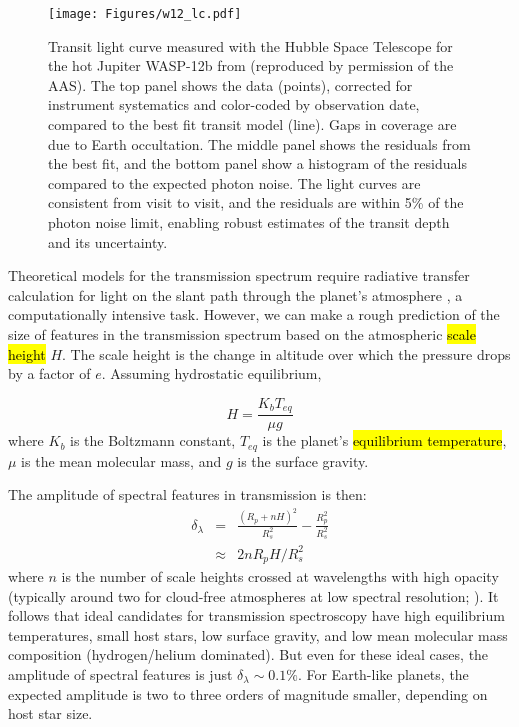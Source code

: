 \documentclass[graybox,natbib,nosecnum]{svmult}
\newcommand{\hbindex}[1]{\hl{#1}\index{#1}}  %
\begin{document}
\begin{figure}
\begin{centering}
\texttt{[image: Figures/w12\_lc.pdf]}
\caption{Transit light curve measured with the Hubble Space Telescope for the hot Jupiter WASP-12b from \citealt{kreidberg15b} (reproduced by permission of the AAS). The top panel shows the data (points), corrected for instrument systematics and color-coded by observation date, compared to the best fit transit model (line). Gaps in coverage are due to Earth occultation. The middle panel shows the residuals from the best fit, and the bottom panel show a histogram of the residuals compared to the expected photon noise. The light curves are consistent from visit to visit, and the residuals are within 5\% of the photon noise limit, enabling robust estimates of the transit depth and its uncertainty.}
\label{fig:lc}       
\end{centering}
\end{figure}

Theoretical models for the transmission spectrum require radiative transfer calculation for light on the slant path through the planet's atmosphere \citep{seager00}, a computationally intensive task. However, we can make a rough prediction of the size of features in the transmission spectrum based on the atmospheric \hbindex{scale height} $H$. The scale height is the change in altitude over which the pressure drops by a factor of $e$. Assuming hydrostatic equilibrium, 

\begin{equation}
H = \frac{K_bT_{eq}}{\mu g}
\end{equation}
where $K_b$ is the Boltzmann constant, $T_{eq}$ is the planet's \hbindex{equilibrium temperature}, $\mu$ is the mean molecular mass, and $g$ is the surface gravity.

The amplitude of spectral features in transmission is then:
\begin{eqnarray}
\delta_\lambda &=& \frac{(R_p + nH)^2}{R_s^2} - \frac{R_p^2}{R_s^2}\\
 & \approx & 2nR_pH/R_s^2
\end{eqnarray} 
where $n$ is the number of scale heights crossed at wavelengths with high opacity (typically around two for cloud-free atmospheres at low spectral resolution; \citealt{stevenson16}). It follows that ideal candidates for transmission spectroscopy have high equilibrium temperatures, small host stars, low surface gravity, and low mean molecular mass composition (hydrogen/helium dominated). But even for these ideal cases, the amplitude of spectral features is just $\delta_\lambda \sim0.1\%$. For Earth-like planets, the expected amplitude is two to three orders of magnitude smaller, depending on host star size. 
\end{document}
